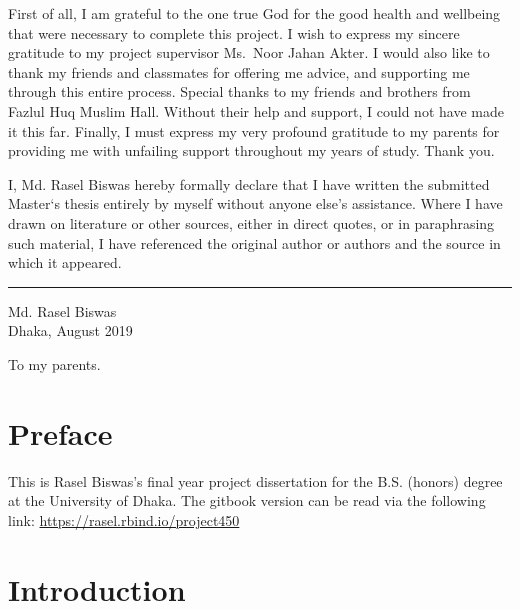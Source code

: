 \documentclass[12pt,oneside,a4paper]{reedthesis}
\begin{document}
  \listoffigures
  \begin{acknowledgements}
    First of all, I am grateful to the one true God for the good health and wellbeing that were necessary to complete this project. I wish to express my sincere gratitude to my project supervisor Ms.~Noor Jahan Akter. I would also like to thank my friends and classmates for offering me advice, and supporting me through this entire process. Special thanks to my friends and brothers from Fazlul Huq Muslim Hall. Without their help and support, I could not have made it this far. Finally, I must express my very profound gratitude to my parents for providing me with unfailing support throughout my years of study. Thank you.
  \end{acknowledgements}
  \begin{declaration}
    I, Md. Rasel Biswas hereby formally declare that I have written the submitted Master`s thesis entirely by myself without anyone else's assistance. Where I have drawn on literature or other sources, either in direct quotes, or in paraphrasing such material, I have referenced the original author or authors and the source in which it appeared.
    \hfill\break
    \hfill\break
    \hfill\break
    \begin{flushleft}
    \rule{0.3\textwidth}{0.4pt}
    \end{flushleft}
    \begin{flushleft}
      Md. Rasel Biswas\\
      Dhaka, August 2019
    \end{flushleft}
  \end{declaration}
  \begin{dedication}
    To my parents.
  \end{dedication}
\mainmatter %
\pagestyle{fancyplain} %

\hypertarget{preface}{%
\chapter*{Preface}\label{preface}}

This is Rasel Biswas's final year project dissertation for the B.S. (honors) degree at the University of Dhaka. The gitbook version can be read via the following link: \url{https://rasel.rbind.io/project450}

\hypertarget{intro}{%
\chapter{Introduction}\label{intro}}
\end{document}
